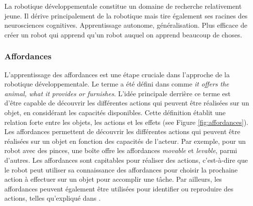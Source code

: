 \documentclass{llncs}
\begin{document}

La robotique développementale constitue un domaine de recherche relativement jeune. Il dérive principalement de la robotique mais tire également ses racines des neurosciences cognitives.
Apprentissage autonome, généralisation.
Plus efficace de créer un robot qui apprend qu'un robot auquel on apprend beaucoup de choses.

\subsubsection{Affordances}
L'apprentissage des affordances est une étape cruciale dans l'approche de la robotique développementale. Le terme a été défini dans \cite{opac-b1085639} comme \textit{it offers the animal, what it provides or furnishes}. L'idée principale derrière ce terme est d'être capable de découvrir les différentes actions qui peuvent être réalisées sur un objet, en considérant les capacités disponibles. Cette définition établit une relation forte entre les objets, les actions et les effets (see Figure \ref{fig:affordances}). Les affordances permettent de découvrir les différentes actions qui peuvent être réalisées sur un objet en fonction des capacités de l'acteur. Par exemple, pour un robot avec des pinces, une boîte offre les affordances  \textit{movable} et \textit{levable}, parmi d'autres. Les affordances sont capitables pour réaliser des actions, c'est-à-dire que le robot peut utiliser sa connaissance des affordances pour choisir la prochaine action à effectuer sur un objet pour accomplir une tâche. Par ailleurs, les affordances peuvent également être utilisées pour identifier ou reproduire des actions, telles qu'expliqué dans \cite{4399517}.

\end{document}
